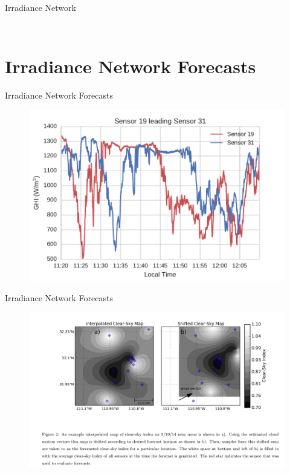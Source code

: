 \documentclass[aspectratio=169]{beamer}
\begin{document}
\begin{frame}{Irradiance Network}
\begin{columns}
\begin{column}{0.4\textwidth}
\begin{figure}[h]
\end{figure}
\end{column}
\end{columns}
\end{frame}

\section{Irradiance Network Forecasts}
\begin{frame}{Irradiance Network Forecasts}
\begin{figure}[h]
  \includegraphics[height=.8\textheight]{../dissertation/figs/leading_sens.pdf}
\end{figure}
\end{frame}

\begin{frame}{Irradiance Network Forecasts}
\begin{figure}[h]
  \includegraphics[height=0.8\textheight]{figs/interpmap.png}
\end{figure}
\end{frame}
\end{document}
